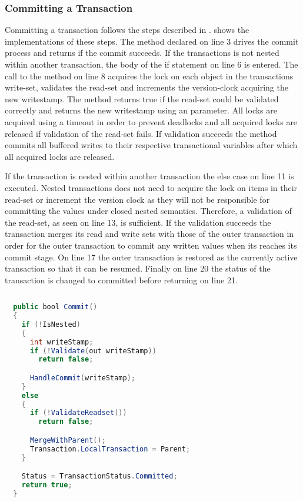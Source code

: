 \subsubsection{Committing a Transaction}
Committing a transaction follows the steps described in .  shows the implementations of these steps. The  method declared on line 3 drives the commit process and returns  if the commit succeeds. If the transactions is not nested within another transaction, the body of the if statement on line 6 is entered. The call to the  method on line 8 acquires the lock on each object in the transactions write-set, validates the read-set and increments the version-clock acquiring the new writestamp. The  method returns true if the read-set could be validated correctly and returns the new writestamp using an  parameter. All locks are acquired using a timeout in order to prevent deadlocks and all acquired locks are released if validation of the read-set fails. If validation succeeds the  method commits all buffered writes to their respective transactional variables after which all acquired locks are released. 

If the transaction is nested within another transaction the else case on line 11 is executed. Nested transactions does not need to acquire the lock on items in their read-set or increment the version clock as they will not be responsible for committing the values under closed nested semantics. Therefore, a validation of the read-set, as seen on line 13, is sufficient. If the validation succeeds the transaction merges its read and write sets with those of the outer transaction in order for the outer transaction to commit any written values when its reaches its commit stage. On line 17 the outer transaction is restored as the currently active transaction so that it can be resumed. Finally on line 20 the status of the transaction is changed to committed before returning on line 21.


\begin{lstlisting}[label=lst:library_commit,
  caption={Committing a Transaction},
  language=Java,  
  showspaces=false,
  showtabs=false,
  breaklines=true,
  showstringspaces=false,
  breakatwhitespace=true,
  commentstyle=\color{greencomments},
  keywordstyle=\color{bluekeywords},
  stringstyle=\color{redstrings},
  morekeywords={atomic, retry, orElse, var, get, set, bool}]  % Start your code-block
  
  public bool Commit()
  {
    if (!IsNested)
    {
      int writeStamp;
      if (!Validate(out writeStamp))
        return false;

      HandleCommit(writeStamp);
    }
    else
    {
      if (!ValidateReadset())
        return false;

      MergeWithParent();
      Transaction.LocalTransaction = Parent;
    }

    Status = TransactionStatus.Committed;
    return true;
  }
\end{lstlisting}

